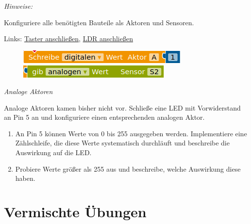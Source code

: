 \begin{minipage}{0.6\textwidth}
	\emph{Hinweise:}
	
	Konfiguriere alle benötigten Bauteile als Aktoren und Sensoren.
	
	\medskip
	\footnotesize%
	Links: \quad \zurueck \hyperref[abb:schaltplan-taster]{Taster anschließen}, \quad \zurueck \hyperref[abb:schaltplan-ldr]{LDR anschließen}
\end{minipage}
\hfill
\begin{minipage}{0.38\textwidth}
	\begin{figure}[H]
		\centering
		\includegraphics[width=0.9\linewidth]{./pics/aktor-ansteuern.png}
		\includegraphics[width=0.9\linewidth]{./pics/sensor-auslesen.png}
	\end{figure}
\end{minipage}

\vspace{3\baselineskip}
\begin{aufgabe} \emph{Analoge Aktoren}
	
	Analoge Aktoren kamen bisher nicht vor. Schließe eine LED mit Vorwiderstand an Pin 5 an und konfiguriere einen entsprechenden analogen Aktor.
	
	\begin{enumerate}[label=\alph*), itemsep=0ex, parsep=0ex]
		\item An Pin 5 können Werte von 0 bis 255 ausgegeben werden. Implementiere eine Zählschleife, die diese Werte systematisch durchläuft und beschreibe die Auswirkung auf die LED.
		\item Probiere Werte größer als 255 aus und beschreibe, welche Auswirkung diese haben.
	\end{enumerate}
\end{aufgabe}


\newpage
\section{Vermischte Übungen}
\label{sec:algo-uebungen}

